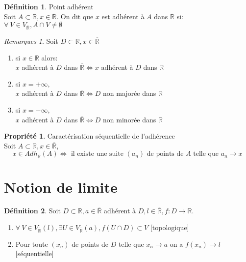 \documentclass[fleqn]{article}
\theoremstyle{definition} \newtheorem*{defi}{D\'efinition}
\theoremstyle{definition} \newtheorem*{theo}{Th\'eor\`eme}
\theoremstyle{definition} \newtheorem*{prop}{Propri\'et\'e}
\theoremstyle{remark} \newtheorem*{rqs}{Remarques}
\begin{document}
\begin{defi} Point adh\'erent \\
		Soit $A \subset \overline{\mathbb{R}}, x \in \overline{\mathbb{R}}$. On dit que $x$ est adh\'erent \`a $A$ dans
		$\overline{\mathbb{R}}$ si: \\
		$\forall\ V \in V_{\overline{\mathbb{R}}%
		}, A \cap V \neq \emptyset$
\end{defi}

\begin{rqs}
	Soit $D \subset \mathbb{R}, x \in \overline{\mathbb{R}}$
	\begin{enumerate}
		\item si $x \in \mathbb{R}$ alors: \\
			$x$ adh\'erent \`a $D$ dans $\overline{\mathbb{R}} \Leftrightarrow x$ adh\'erent \`a $D$ dans $\mathbb{R}$
		\item si $x = +\infty,$ \\
			$x$ adh\'erent \`a $D$ dans $\overline{\mathbb{R}} \Leftrightarrow D$ non major\'ee dans $\mathbb{R}$
		\item si $x = -\infty,$ \\
			$x$ adh\'erent \`a $D$ dans $\overline{\mathbb{R}} \Leftrightarrow D$ non minor\'ee dans $\mathbb{R}$
	\end{enumerate}
\end{rqs}
\begin{prop} Caract\'erisation s\'equentielle de l'adh\'erence \\
	Soit $A \subset \mathbb{R}, x \in \overline{\mathbb{R}}$,
	\[x \in Adh_{\overline{\mathbb{R}}%
	}(A) \Leftrightarrow \text{ il existe une suite } (a_n) \text{ de points de } A \text{ telle que } a_n \rightarrow x\]
\end{prop}

\section{Notion de limite}
\begin{defi}
	Soit $D \subset \mathbb{R}, a \in \overline{\mathbb{R}}$ adh\'erent \`a $D, l \in \overline{\mathbb{R}}, f: D \rightarrow \mathbb{R}$.
	\begin{enumerate}
		\item $\forall\ V \in V_{\overline{\mathbb{R}}%
		}(l), \exists U \in V_{\overline{\mathbb{R}}%
		}(a), f(U \cap D) \subset V$ [topologique]
		\item Pour toute $(x_n)$ de points de $D$ telle que $x_n \rightarrow a$ on a $f(x_n) \rightarrow l $ [s\'equentielle]
	\end{enumerate}
\end{defi}
\end{document}
